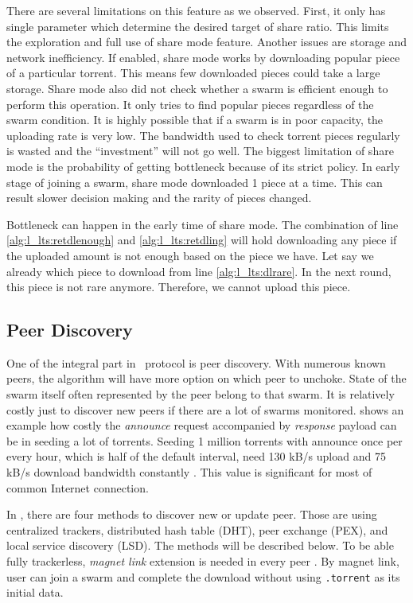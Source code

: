 There are several limitations on this feature as we observed. First, it only has single parameter which determine the desired target of share ratio. This limits the exploration and full use of share mode feature. Another issues are storage and network inefficiency. If enabled, share mode works by downloading popular piece of a particular torrent. This means few downloaded pieces could take a large storage. Share mode also did not check whether a swarm is efficient enough to perform this operation. It only tries to find popular pieces regardless of the swarm condition. It is highly possible that if a swarm is in poor capacity, the uploading rate is very low. The bandwidth used to check torrent pieces regularly is wasted and the ``investment'' will not go well. The biggest limitation of share mode is the probability of getting bottleneck because of its strict policy. In early stage of joining a swarm, share mode downloaded 1 piece at a time. This can result slower decision making and the rarity of pieces changed. 

Bottleneck can happen in the early time of share mode. The combination of line \ref{alg:l_lts:retdlenough} and \ref{alg:l_lts:retdling} will hold downloading any piece if the uploaded amount is not enough based on the piece we have. Let say we already which piece to download from line \ref{alg:l_lts:dlrare}. In the next round, this piece is not rare anymore. Therefore, we cannot upload this piece.  
\subsection{Peer Discovery}
One of the integral part in \bt~protocol is peer discovery. With numerous known peers, the algorithm will have more option on which peer to unchoke. State of the swarm itself often represented by the peer belong to that swarm. It is relatively costly just to discover new peers if there are a lot of swarms monitored. \citeauthor{2012:milliontorrent:arvid} shows an example how costly the \textit{announce} request accompanied by \textit{response} payload can be in seeding a lot of torrents. Seeding 1 million torrents with announce once per every hour, which is half of the default interval, need 130 kB/s upload and 75 kB/s download bandwidth constantly \cite{2012:milliontorrent:arvid}. This value is significant for most of common Internet connection.

In \bt, there are four methods to discover new or update peer. Those are using centralized trackers, distributed hash table (DHT), peer exchange (PEX), and local service discovery (LSD). The methods will be described below. To be able fully trackerless, \textit{magnet link} extension is needed in every peer \cite{2008:magnet:hazel}. By magnet link, user can join a swarm and complete the download without using \texttt{.torrent} as its initial data. 

